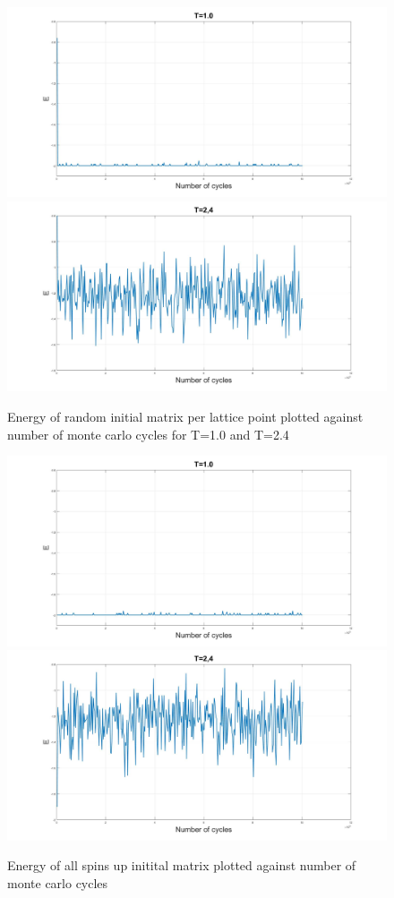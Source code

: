 \documentclass[10pt,a4paper]{article}
\begin{document}
\begin{figure} [H]
\centerline{
\includegraphics[scale=0.15]{RANDOMenergy1.jpg}
\includegraphics[scale=0.15]{RANDOMenergy24.jpg}
}
\caption{Energy of random initial matrix per lattice point plotted against number of monte carlo cycles for T=1.0 and T=2.4}
\label{fig:RandomEnergy}
\end{figure}


\begin{figure} [H]
\centerline{
\includegraphics[scale=0.15]{UPenergy1.jpg}
\includegraphics[scale=0.15]{UPenergy24.jpg}
}
\caption{Energy of all spins up initital matrix plotted against number of monte carlo cycles}
\label{fig:UpEnergy}
\end{figure}
\end{document}

